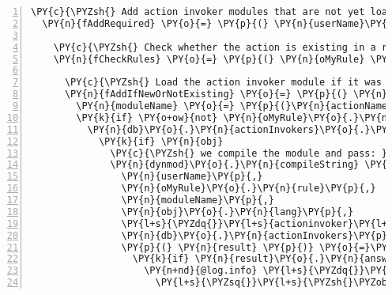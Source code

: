 \begin{Verbatim}[fontsize=\scriptsize,commandchars=\\\{\},numbers=left,firstnumber=1,stepnumber=1]
  \PY{c}{\PYZsh{} Add action invoker modules that are not yet loaded}
  \PY{n}{fAddRequired} \PY{o}{=} \PY{p}{(} \PY{n}{userName}\PY{p}{,} \PY{n}{oUser} \PY{p}{)} \PY{o}{=}\PY{o}{\PYZgt{}}

    \PY{c}{\PYZsh{} Check whether the action is existing in a rule and load if not}
    \PY{n}{fCheckRules} \PY{o}{=} \PY{p}{(} \PY{n}{oMyRule} \PY{p}{)} \PY{o}{=}\PY{o}{\PYZgt{}}

      \PY{c}{\PYZsh{} Load the action invoker module if it was part of the updated rule or if it\PYZsq{}s new}
      \PY{n}{fAddIfNewOrNotExisting} \PY{o}{=} \PY{p}{(} \PY{n}{actionName} \PY{p}{)} \PY{o}{=}\PY{o}{\PYZgt{}}
        \PY{n}{moduleName} \PY{o}{=} \PY{p}{(}\PY{n}{actionName}\PY{o}{.}\PY{n}{split} \PY{l+s}{\PYZsq{}}\PY{l+s}{ \PYZhy{}\PYZgt{} }\PY{l+s}{\PYZsq{}}\PY{p}{)}\PY{p}{[} \PY{l+m+mi}{0} \PY{p}{]}
        \PY{k}{if} \PY{o+ow}{not} \PY{n}{oMyRule}\PY{o}{.}\PY{n}{actions}\PY{p}{[}\PY{n}{moduleName}\PY{p}{]} \PY{o+ow}{or} \PY{n}{oMyRule}\PY{o}{.}\PY{n}{rule}\PY{o}{.}\PY{n}{id} \PY{o+ow}{is} \PY{n}{updatedRuleId}
          \PY{n}{db}\PY{o}{.}\PY{n}{actionInvokers}\PY{o}{.}\PY{n}{getModule} \PY{n}{userName}\PY{p}{,} \PY{n}{moduleName}\PY{p}{,} \PY{p}{(} \PY{n}{err}\PY{p}{,} \PY{n}{obj} \PY{p}{)} \PY{o}{=}\PY{o}{\PYZgt{}}
            \PY{k}{if} \PY{n}{obj}
              \PY{c}{\PYZsh{} we compile the module and pass: }
              \PY{n}{dynmod}\PY{o}{.}\PY{n}{compileString} \PY{n}{obj}\PY{o}{.}\PY{n}{data}\PY{p}{,}  \PY{c}{\PYZsh{} code}
                \PY{n}{userName}\PY{p}{,}                           \PY{c}{\PYZsh{} userId}
                \PY{n}{oMyRule}\PY{o}{.}\PY{n}{rule}\PY{p}{,}                     \PY{c}{\PYZsh{} oRule}
                \PY{n}{moduleName}\PY{p}{,}                         \PY{c}{\PYZsh{} moduleId}
                \PY{n}{obj}\PY{o}{.}\PY{n}{lang}\PY{p}{,}                           \PY{c}{\PYZsh{} script language}
                \PY{l+s}{\PYZdq{}}\PY{l+s}{actioninvoker}\PY{l+s}{\PYZdq{}}\PY{p}{,}                    \PY{c}{\PYZsh{} module type}
                \PY{n}{db}\PY{o}{.}\PY{n}{actionInvokers}\PY{p}{,}                  \PY{c}{\PYZsh{} the DB interface}
                \PY{p}{(} \PY{n}{result} \PY{p}{)} \PY{o}{=}\PY{o}{\PYZgt{}}
                  \PY{k}{if} \PY{n}{result}\PY{o}{.}\PY{n}{answ}\PY{o}{.}\PY{n}{code} \PY{o+ow}{is} \PY{l+m+mi}{200}
                    \PY{n+nd}{@log.info} \PY{l+s}{\PYZdq{}}\PY{l+s}{EN | Module }\PY{l+s}{\PYZsq{}}\PY{l+s}{\PYZsh{}\PYZob{} moduleName \PYZcb{}}\PY{l+s}{\PYZsq{}}\PY{l+s}{ successfully loaded for userName}
                      \PY{l+s}{\PYZsq{}}\PY{l+s}{\PYZsh{}\PYZob{} userName \PYZcb{}}\PY{l+s}{\PYZsq{}} \PY{o+ow}{in} \PY{n}{rule} \PY{l+s}{\PYZsq{}}\PY{l+s}{\PYZsh{}\PYZob{} oMyRule.rule.id \PYZcb{}}\PY{l+s}{\PYZsq{}}\PY{l+s}{\PYZdq{}}

\end{Verbatim}
